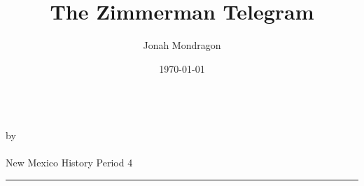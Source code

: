 \documentclass[12pt]{article}
\newcommand{\PutTitle}[1]
{
    \begin{center}
        {\huge\bfseries\thetitle}\\
        by \theauthor\\
        \thedate\\
        #1        
    \end{center}
    \hrule
    \vspace{2ex}
}
\begin{document}
\title{The Zimmerman Telegram}
\author{Jonah Mondragon}
\date{\today}
\PutTitle{New Mexico History Period 4}

\autocite{ZimmermanTelegram}

\pagestyle{headings}
\newpage

\printbibliography
\end{document}
